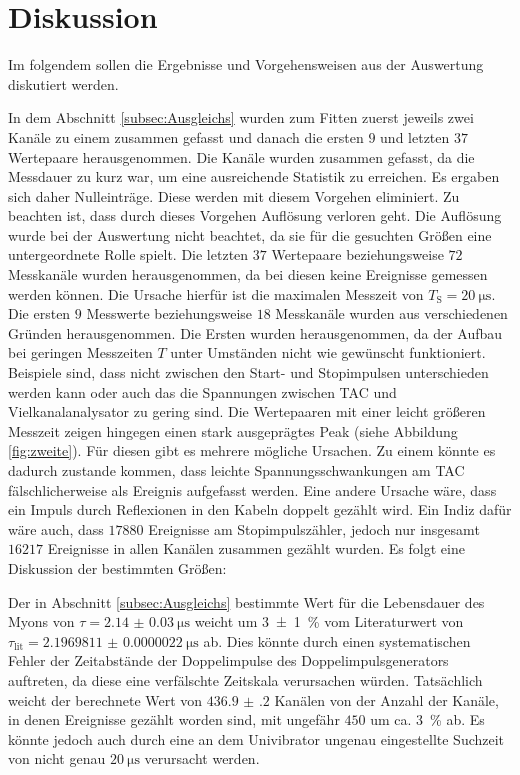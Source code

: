 
\section{Diskussion}
\label{sec:Diskussion}
Im folgendem sollen die Ergebnisse und Vorgehensweisen aus der Auswertung diskutiert werden.

In dem Abschnitt \ref{subsec:Ausgleichs} wurden zum Fitten zuerst jeweils zwei Kanäle zu einem zusammen gefasst und danach die ersten $9$ und letzten $37$ Wertepaare herausgenommen.
Die Kanäle wurden zusammen gefasst, da die Messdauer zu kurz war, um eine ausreichende Statistik zu erreichen. Es ergaben sich daher Nulleinträge. Diese werden mit diesem Vorgehen eliminiert. Zu beachten ist, dass durch dieses Vorgehen Auflösung verloren geht. Die Auflösung wurde bei der Auswertung nicht beachtet, da sie für die gesuchten Größen eine untergeordnete Rolle spielt. Die letzten $37$ Wertepaare beziehungsweise $72$ Messkanäle wurden herausgenommen, da bei diesen keine Ereignisse gemessen werden können. Die Ursache hierfür ist die maximalen Messzeit von $T_\text{S}=\SI{20}{\micro\second}$. Die ersten $9$ Messwerte beziehungsweise $18$ Messkanäle wurden aus verschiedenen Gründen herausgenommen. Die Ersten wurden herausgenommen, da der Aufbau bei geringen Messzeiten $T$ unter Umständen nicht wie gewünscht funktioniert. Beispiele sind, dass nicht zwischen den Start- und Stopimpulsen unterschieden werden kann oder auch das die Spannungen zwischen TAC und Vielkanalanalysator zu gering sind. Die Wertepaaren mit einer leicht größeren Messzeit zeigen hingegen einen stark ausgeprägtes Peak (siehe Abbildung \ref{fig:zweite}). Für diesen gibt es mehrere mögliche Ursachen. Zu einem könnte es dadurch zustande kommen, dass leichte Spannungsschwankungen am TAC fälschlicherweise als Ereignis aufgefasst werden. Eine andere Ursache wäre, dass ein Impuls durch Reflexionen in den Kabeln doppelt gezählt wird. Ein Indiz dafür wäre auch, dass  $17880$ Ereignisse am Stopimpulszähler, jedoch nur insgesamt $16217$ Ereignisse in allen Kanälen zusammen gezählt wurden.
Es folgt eine Diskussion der bestimmten Größen:

Der in Abschnitt \ref{subsec:Ausgleichs} bestimmte Wert für die Lebensdauer des Myons von $\tau=\SI{2.14(3)}{\micro\second}$ weicht um \SI{3(1)}{\percent} vom Literaturwert von $\tau_\text{lit}=\SI{2.1969811(22)}{\micro\second}$ \cite{ParticlePhysics} ab. Dies könnte durch einen systematischen Fehler der Zeitabstände der Doppelimpulse des Doppelimpulsgenerators auftreten, da diese eine verfälschte Zeitskala verursachen würden. Tatsächlich weicht der berechnete Wert von $\num{436.9(2)}$ Kanälen von der Anzahl der Kanäle, in denen Ereignisse gezählt worden sind, mit ungefähr $450$ um ca. \SI{3}{\percent} ab. 
Es könnte jedoch auch durch eine an dem Univibrator ungenau eingestellte Suchzeit von nicht genau $\SI{20}{\micro\second}$ verursacht werden.

